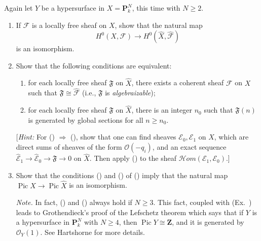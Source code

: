 { Again let $Y$ be a hypersurface in $X=\mathbf P_k^N$, this time with $N\geqslant2$.
\begin{enumerate}[label=(\alph*),leftmargin=2.7em,itemsep=0pt,topsep=1pt,parsep=0pt]
\item\hypertarget{ex-III-11.6a}{} If $\mathcal F$ is a locally free sheaf on $X$, show that the natural map
\[
 H^0(X,\mathcal F)\to H^0(\widehat X,\widehat{\mathcal F})
\]
is an isomorphism.
\item\hypertarget{ex-III-11.6b}{} Show that the following conditions are equivalent:
\begin{enumerate}[label=(\roman*),leftmargin=2.4em,itemsep=0pt,topsep=1pt,parsep=0pt]
\item\hypertarget{ex-III-11.6bi}{} for each locally free sheaf $\mathfrak F$ on $\widehat X$, there exists a coherent sheaf $\mathcal F$ on $X$ such that $\mathfrak F\cong\widehat{\mathcal F}$ (i.e., $\mathfrak F$ is \emph{algebraizable});
\item\hypertarget{ex-III-11.6bii}{} for each locally free sheaf $\mathfrak F$ on $\widehat X$, there is an integer $n_0$ such that $\mathfrak F(n)$ is generated by global sections for all $n\geqslant n_0$.
\end{enumerate}
[\emph{Hint:} For () $\Rightarrow$ (), show that one can find sheaves $\mathcal E_0,\mathcal E_1$ on $X$, which are direct sums of sheaves of the form $\mathcal O(-q_i)$, and an exact sequence $\widehat{\mathcal E}_1\to\widehat{\mathcal E}_0\to\mathfrak F\to0$ on $\widehat X$. Then apply () to the sheaf $\mathcal Hom(\mathcal E_1,\mathcal E_0)$.]
\item Show that the conditions () and () of () imply that the natural map $\operatorname{Pic}X\to\operatorname{Pic}\widehat X$ is an isomorphism.

\emph{Note.} In fact, () and () always hold if $N\geqslant3$. This fact, coupled with (Ex.~) leads to Grothendieck's proof  of the Lefschetz theorem which says that if $Y$ is a hypersurface in $\mathbf P_k^N$ with $N\geqslant4$, then $\operatorname{Pic}Y\cong\mathbf Z$, and it is generated by $\mathcal O_Y(1)$. See Hartshorne  for more details.
\end{enumerate}

}
